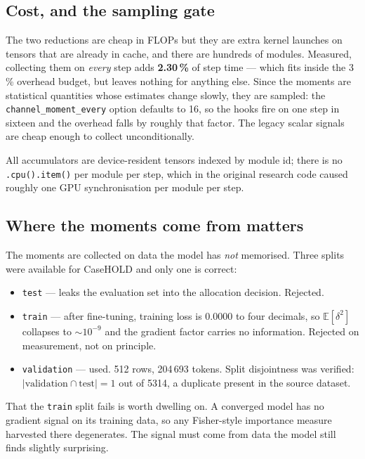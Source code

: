\documentclass[11pt]{article}
\newcommand{\pct}{\,\%}
\newcommand{\code}[1]{\texttt{#1}}
\begin{document}
\subsection{Cost, and the sampling gate}

The two reductions are cheap in FLOPs but they are extra kernel launches on tensors that are
already in cache, and there are hundreds of modules. Measured, collecting them on \emph{every}
step adds \textbf{2.30\pct} of step time --- which fits inside the 3\pct{} overhead budget, but
leaves nothing for anything else. Since the moments are statistical quantities whose estimates
change slowly, they are sampled: the \code{channel\_moment\_every} option defaults to 16, so the
hooks fire on one step in sixteen and the overhead falls by roughly that factor. The legacy
scalar signals are cheap enough to collect unconditionally.

All accumulators are device-resident tensors indexed by module id; there is no
\code{.cpu().item()} per module per step, which in the original research code caused roughly one
GPU synchronisation per module per step.

\subsection{Where the moments come from matters}

The moments are collected on data the model has \emph{not} memorised. Three splits were
available for CaseHOLD and only one is correct:

\begin{itemize}
\item \code{test} --- leaks the evaluation set into the allocation decision. Rejected.
\item \code{train} --- after fine-tuning, training loss is $0.0000$ to four decimals, so
$\mathbb{E}[\delta^2]$ collapses to $\sim 10^{-9}$ and the gradient factor carries no
information. Rejected on measurement, not on principle.
\item \code{validation} --- used. 512 rows, 204\,693 tokens. Split disjointness was verified:
$|\text{validation} \cap \text{test}| = 1$ out of 5314, a duplicate present in the source
dataset.
\end{itemize}

That the \code{train} split fails is worth dwelling on. A converged model has no gradient signal
on its training data, so any Fisher-style importance measure harvested there degenerates. The
signal must come from data the model still finds slightly surprising.
\end{document}
